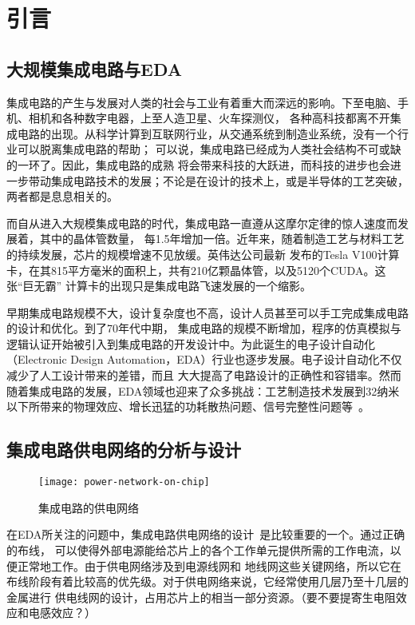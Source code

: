 \chapter{引言}
\label{cha:intro}

\section{大规模集成电路与EDA}

集成电路的产生与发展对人类的社会与工业有着重大而深远的影响。下至电脑、手机、相机和各种数字电器，上至人造卫星、火车探测仪，
各种高科技都离不开集成电路的出现。从科学计算到互联网行业，从交通系统到制造业系统，没有一个行业可以脱离集成电路的帮助；
可以说，集成电路已经成为人类社会结构不可或缺的一环了。因此，集成电路的成熟
将会带来科技的大跃进，而科技的进步也会进一步带动集成电路技术的发展；不论是在设计的技术上，或是半导体的工艺突破，两者都是息息相关的。

而自从进入大规模集成电路的时代，集成电路一直遵从这摩尔定律的惊人速度而发展着，其中的晶体管数量，
每1.5年增加一倍。近年来，随着制造工艺与材料工艺的持续发展，芯片的规模增速不见放缓。英伟达公司最新
发布的Tesla V100计算卡，在其815平方毫米的面积上，共有210亿颗晶体管，以及5120个CUDA。这张“巨无霸”
计算卡的出现只是集成电路飞速发展的一个缩影。

早期集成电路规模不大，设计复杂度也不高，设计人员甚至可以手工完成集成电路的设计和优化。到了70年代中期，
集成电路的规模不断增加，程序的仿真模拟与逻辑认证开始被引入到集成电路的开发设计中。为此诞生的电子设计自动化
（Electronic Design Automation，EDA）行业也逐步发展。电子设计自动化不仅减少了人工设计带来的差错，而且
大大提高了电路设计的正确性和容错率。然而随着集成电路的发展，EDA领域也迎来了众多挑战：工艺制造技术发展到32纳米
以下所带来的物理效应、增长迅猛的功耗散热问题、信号完整性问题等~\cite{shang2004thermal, swaminathan2010designing}。

\section{集成电路供电网络的分析与设计}

\begin{figure}[H] %
  \centering
  \texttt{[image: power-network-on-chip]}
  \caption{集成电路的供电网络}
  \label{fig:figpower}
\end{figure}

在EDA所关注的问题中，集成电路供电网络的设计~\cite{zhu2004power}是比较重要的一个。通过正确的布线，
可以使得外部电源能给芯片上的各个工作单元提供所需的工作电流，以便正常地工作。由于供电网络涉及到电源线网和
地线网这些关键网络，所以它在布线阶段有着比较高的优先级。对于供电网络来说，它经常使用几层乃至十几层的金属进行
供电线网的设计，占用芯片上的相当一部分资源。（要不要提寄生电阻效应和电感效应？）

